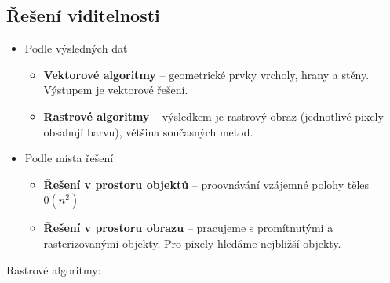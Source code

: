 \subsection{Řešení viditelnosti}
\begin{itemize}
	\item Podle výsledných dat
	\begin{itemize}
		\item \textbf{Vektorové algoritmy} -- geometrické prvky vrcholy, hrany a stěny. Výstupem je vektorové řešení.
		\item \textbf{Rastrové algoritmy} -- výsledkem je rastrový obraz (jednotlivé pixely obsahují barvu), většina současných metod.
	\end{itemize}
	\item Podle místa řešení
	\begin{itemize}
		\item \textbf{Řešení v prostoru objektů} -- proovnávání vzájemné polohy těles $0(n^2)$
		\item \textbf{Řešení v prostoru obrazu} -- pracujeme s promítnutými a rasterizovanými objekty. Pro pixely hledáme nejbližší objekty.
	\end{itemize}
\end{itemize}
Rastrové algoritmy:
